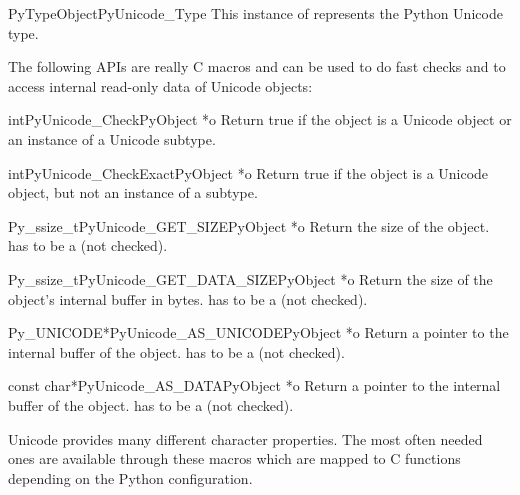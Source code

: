 \begin{cvardesc}{PyTypeObject}{PyUnicode_Type}
  This instance of  represents the Python Unicode
  type.
\end{cvardesc}

The following APIs are really C macros and can be used to do fast
checks and to access internal read-only data of Unicode objects:

\begin{cfuncdesc}{int}{PyUnicode_Check}{PyObject *o}
  Return true if the object  is a Unicode object or an
  instance of a Unicode subtype.
\end{cfuncdesc}

\begin{cfuncdesc}{int}{PyUnicode_CheckExact}{PyObject *o}
  Return true if the object  is a Unicode object, but not an
  instance of a subtype.
\end{cfuncdesc}

\begin{cfuncdesc}{Py_ssize_t}{PyUnicode_GET_SIZE}{PyObject *o}
  Return the size of the object.   has to be a
   (not checked).
\end{cfuncdesc}

\begin{cfuncdesc}{Py_ssize_t}{PyUnicode_GET_DATA_SIZE}{PyObject *o}
  Return the size of the object's internal buffer in bytes.  
  has to be a  (not checked).
\end{cfuncdesc}

\begin{cfuncdesc}{Py_UNICODE*}{PyUnicode_AS_UNICODE}{PyObject *o}
  Return a pointer to the internal  buffer of the
  object.   has to be a  (not checked).
\end{cfuncdesc}

\begin{cfuncdesc}{const char*}{PyUnicode_AS_DATA}{PyObject *o}
  Return a pointer to the internal buffer of the object.
   has to be a  (not checked).
\end{cfuncdesc}


Unicode provides many different character properties. The most often
needed ones are available through these macros which are mapped to C
functions depending on the Python configuration.

